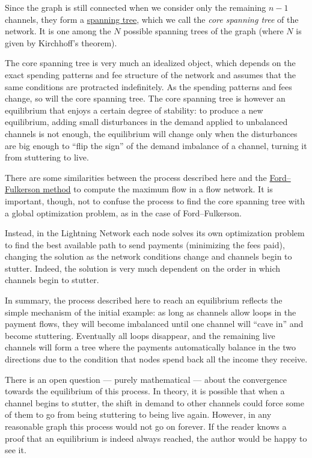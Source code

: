 \documentclass[a4paper]{article}
\begin{document}
Since the graph is still connected when we consider only the remaining $n-1$ channels, they form a \href{https://en.wikipedia.org/wiki/Spanning_tree}{spanning tree}, which we call the \emph{core spanning tree} of the network. It is one among the $N$ possible spanning trees of the graph (where $N$ is given by Kirchhoff's theorem).

The core spanning tree is very much an idealized object, which depends on the exact spending patterns and fee structure of the network and assumes that the same conditions are protracted indefinitely. As the spending patterns and fees change, so will the core spanning tree. The core spanning tree is however an equilibrium that enjoys a certain degree of stability: to produce a new equilibrium, adding small disturbances in the demand applied to unbalanced channels is not enough, the equilibrium will change only when the disturbances are big enough to ``flip the sign'' of the demand imbalance of a channel, turning it from stuttering to live.

There are some similarities between the process described here and the \href{https://en.wikipedia.org/wiki/Ford\%E2\%80\%93Fulkerson_algorithm}{Ford--Fulkerson method} to compute the maximum flow in a flow network. It is important, though, not to confuse the process to find the core spanning tree with a global optimization problem, as in the case of Ford--Fulkerson.

Instead, in the Lightning Network each node solves its own optimization problem to find the best available path to send payments (minimizing the fees paid), changing the solution as the network conditions change and channels begin to stutter. Indeed, the solution is very much dependent on the order in which channels begin to stutter.

In summary, the process described here to reach an equilibrium reflects the simple mechanism of the initial example: as long as channels allow loops in the payment flows, they will become imbalanced until one channel will ``cave in'' and become stuttering. Eventually all loops disappear, and the remaining live channels will form a tree where the payments automatically balance in the two directions due to the condition that nodes spend back all the income they receive.

There is an open question --- purely mathematical --- about the convergence towards the equilibrium of this process. In theory, it is possible that when a channel begins to stutter, the shift in demand to other channels could force some of them to go from being stuttering to being live again. However, in any reasonable graph this process would not go on forever. If the reader knows a proof that an equilibrium is indeed always reached, the author would be happy to see it.
\end{document}
